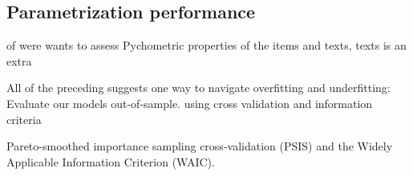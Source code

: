 \subsection{Parametrization performance}

of were wants to assess  Pychometric properties of the items and texts, texts is an extra

All of the preceding suggests one way to navigate overfitting and underfitting: Evaluate our models out-of-sample. using cross validation and information criteria

Pareto-smoothed importance sampling cross-validation (PSIS) and the  Widely Applicable Information Criterion (WAIC).